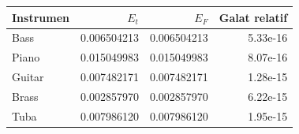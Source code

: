 \begin{tabular}{lrrr}
\toprule
Instrumen & $E_t$ & $E_F$ & Galat relatif \\
\midrule
Bass & 0.006504213 & 0.006504213 & 5.33e-16 \\
Piano & 0.015049983 & 0.015049983 & 8.07e-16 \\
Guitar & 0.007482171 & 0.007482171 & 1.28e-15 \\
Brass & 0.002857970 & 0.002857970 & 6.22e-15 \\
Tuba & 0.007986120 & 0.007986120 & 1.95e-15 \\
\bottomrule
\end{tabular}
